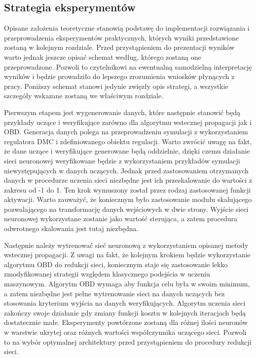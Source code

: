 \subsection{Strategia eksperymentów}
Opisane założenia teoretyczne stanowią podstawę do implementacji rozwiązania i przeprowadzenia eksperymentów praktycznych, których wyniki przedstawione zostaną w kolejnym rozdziale. Przed przystąpieniem do prezentacji wyników warto jednak jeszcze opisać schemat według, którego zostaną one przeprowadzone. Pozwoli to czytelnikowi na ewentualną samodzielną interpretację wyników i będzie prowadziło do lepszego zrozumienia wniosków płynących z pracy. Poniższy schemat stanowi jedynie zwięzły opis strategi, a wszystkie szczegóły wskazane zostaną we właściwym rozdziale. 
\par Pierwszym etapem jest wygenerowanie danych, które następnie stanowić będą przykłady uczące i weryfikujące zarówno dla algorytmu wstecznej propagacji jak i OBD. Generacja danych polega na przeprowadzeniu symulacji z wykorzystaniem regulatora DMC i zdefiniowanego obiektu regulacji. Warto zwrócić uwagę na fakt, że dane uczące i weryfikujące generowane będą oddzielnie, dzięki czemu działanie sieci neuronowej weryfikowane będzie z wykorzystaniem przykładów symulacji niewystępujących w danych uczących. Jednak przed zastosowaniem otrzymanych danych w procedurze uczenia sieci niezbędne jest ich przeskalowanie do wartości z zakresu od -1 do 1. Ten krok wymuszony został przez rodzaj zastosowanej funkcji aktywacji. Warto zauważyć, że koniecznym było zastosowanie modułu skalującego pozwalającego na transformację danych wejściowych w dwie strony. Wyjście sieci neuronowej wykorzystane zostanie jako wartość sterująca, a zatem procedura odwrotnego skalowania jest tutaj niezbędna. 
\par Następnie należy wytrenować sieć neuronową z wykorzystaniem opisanej metody wstecznej propagacji. Z uwagi na fakt, że kolejnym krokiem będzie wykorzystanie algorytmu OBD do redukcji sieci, koniecznym staje się zastosowanie lekko zmodyfikowanej strategii względem klasycznego podejścia w uczeniu maszynowym. Algorytm OBD wymaga aby funkcja celu była w swoim minimum, a zatem niezbędne jest pełne wytrenowanie sieci na danych uczących bez stosowania kryterium wyjścia na danych weryfikujących. Algorytm uczenia sieci zakończy swoje działanie gdy zmiany funkcji kosztu w kolejnych iteracjach będą dostatecznie małe. Eksperymenty powtórzone zostaną dla różnej ilości neuronów w warstwie ukrytej oraz różnych wartości współczynnika uczącego sieci. Pozwoli to na wybór optymalnej architektury przed przystąpieniem do procedury redukcji sieci. 
